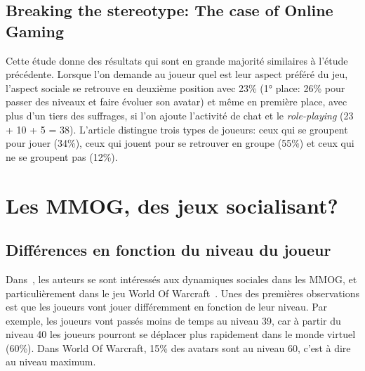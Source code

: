 \documentclass[10pt,twocolumn]{article}
\begin{document}
\subsection{Breaking the stereotype: The case of Online Gaming}
Cette étude donne des résultats qui sont en grande majorité similaires à l'étude précédente. Lorsque l'on demande au joueur quel est leur aspect préféré du jeu, l'aspect sociale se retrouve en deuxième position avec 23\% (1° place: 26\% pour passer des niveaux et faire évoluer son avatar) et même en première place, avec plus d'un tiers des suffrages, si l'on ajoute l'activité de chat et le \textit{role-playing} (23 + 10 + 5 = 38). L'article distingue trois types de joueurs: ceux qui se groupent pour jouer (34\%), ceux qui jouent pour se retrouver en groupe (55\%) et ceux qui ne se groupent pas (12\%).



\section{Les MMOG, des jeux socialisant?}
\subsection{Différences en fonction du niveau du joueur}
Dans~\cite{1124834}, les auteurs se sont intéressés aux dynamiques sociales dans les MMOG, et particulièrement dans le jeu World Of Warcraft~\cite{wow}. Unes des premières observations est que les joueurs vont jouer différemment en fonction de leur niveau. Par exemple, les joueurs vont passés moins de temps au niveau 39, car à partir du niveau 40 les joueurs pourront se déplacer plus rapidement dans le monde virtuel (60\%). Dans World Of Warcraft, 15\% des avatars sont au niveau 60, c'est à dire au niveau maximum.
\end{document}
